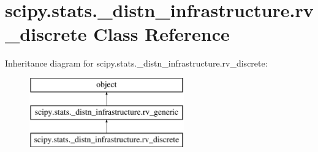\hypertarget{classscipy_1_1stats_1_1__distn__infrastructure_1_1rv__discrete}{}\section{scipy.\+stats.\+\_\+distn\+\_\+infrastructure.\+rv\+\_\+discrete Class Reference}
\label{classscipy_1_1stats_1_1__distn__infrastructure_1_1rv__discrete}
Inheritance diagram for scipy.\+stats.\+\_\+distn\+\_\+infrastructure.\+rv\+\_\+discrete\+:\begin{figure}[H]
\begin{center}
\leavevmode
\includegraphics[height=3.000000cm]{classscipy_1_1stats_1_1__distn__infrastructure_1_1rv__discrete}
\end{center}
\end{figure}
